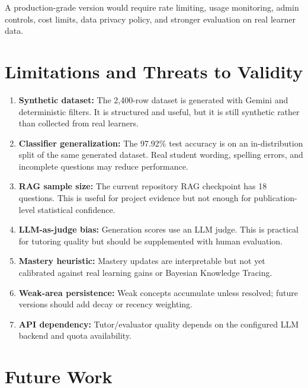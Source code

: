 \documentclass[11pt,a4paper]{article}
\begin{document}
A production-grade version would require rate limiting, usage monitoring, admin controls, cost limits, data privacy policy, and stronger evaluation on real learner data.

\section{Limitations and Threats to Validity}

\begin{enumerate}
    \item \textbf{Synthetic dataset:} The 2,400-row dataset is generated with Gemini and deterministic filters. It is structured and useful, but it is still synthetic rather than collected from real learners.
    \item \textbf{Classifier generalization:} The 97.92\% test accuracy is on an in-distribution split of the same generated dataset. Real student wording, spelling errors, and incomplete questions may reduce performance.
    \item \textbf{RAG sample size:} The current repository RAG checkpoint has 18 questions. This is useful for project evidence but not enough for publication-level statistical confidence.
    \item \textbf{LLM-as-judge bias:} Generation scores use an LLM judge. This is practical for tutoring quality but should be supplemented with human evaluation.
    \item \textbf{Mastery heuristic:} Mastery updates are interpretable but not yet calibrated against real learning gains or Bayesian Knowledge Tracing.
    \item \textbf{Weak-area persistence:} Weak concepts accumulate unless resolved; future versions should add decay or recency weighting.
    \item \textbf{API dependency:} Tutor/evaluator quality depends on the configured LLM backend and quota availability.
\end{enumerate}

\section{Future Work}
\end{document}
